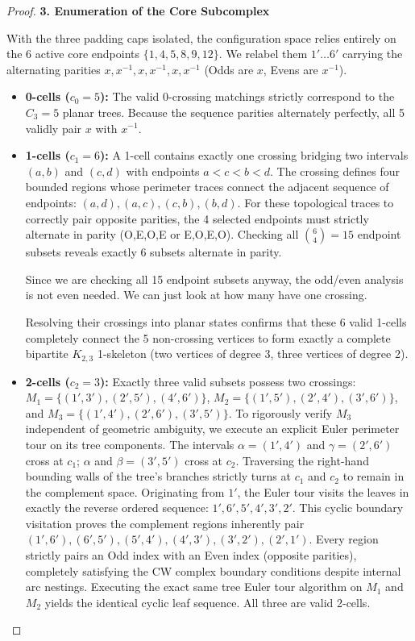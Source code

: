 \documentclass[12pt]{article}
\newcommand{\review}[1]{\begin{reviewbox}#1\end{reviewbox}}
\begin{document}
\begin{proof}
\vspace{1em}
\noindent\textbf{3. Enumeration of the Core Subcomplex}

With the three padding caps isolated, the configuration space relies entirely on the 6 active core endpoints $\{1, 4, 5, 8, 9, 12\}$. We relabel them $1' \dots 6'$ carrying the alternating parities $x, x^{-1}, x, x^{-1}, x, x^{-1}$ (Odds are $x$, Evens are $x^{-1}$).
\begin{itemize}
    \item \textbf{0-cells ($c_0=5$):} The valid 0-crossing matchings strictly correspond to the $C_3 = 5$ planar trees. Because the sequence parities alternately perfectly, all 5 validly pair $x$ with $x^{-1}$.
    \item \textbf{1-cells ($c_1=6$):} A 1-cell contains exactly one crossing bridging two intervals $(a,b)$ and $(c,d)$ with endpoints $a < c < b < d$. The crossing defines four bounded regions whose perimeter traces connect the adjacent sequence of endpoints: $(a,d), (a,c), (c,b), (b,d)$. For these topological traces to correctly pair opposite parities, the 4 selected endpoints must strictly alternate in parity (O,E,O,E or E,O,E,O). Checking all $\binom{6}{4}=15$ endpoint subsets reveals exactly 6 subsets alternate in parity. 
    \review{Since we are checking all 15 endpoint subsets anyway, the odd/even analysis is not even needed. We can just look at how many have one crossing.}
    Resolving their crossings into planar states confirms that these 6 valid 1-cells completely connect the 5 non-crossing vertices to form exactly a complete bipartite $K_{2,3}$ 1-skeleton (two vertices of degree 3, three vertices of degree 2).
    \item \textbf{2-cells ($c_2=3$):} Exactly three valid subsets possess two crossings: $M_1 = \{(1',3'), (2',5'), (4',6')\}$, $M_2 = \{(1',5'), (2',4'), (3',6')\}$, and $M_3 = \{(1',4'), (2',6'), (3',5')\}$. 
    To rigorously verify $M_3$ independent of geometric ambiguity, we execute an explicit Euler perimeter tour on its tree components. The intervals $\alpha=(1',4')$ and $\gamma=(2',6')$ cross at $c_1$; $\alpha$ and $\beta=(3',5')$ cross at $c_2$. Traversing the right-hand bounding walls of the tree's branches strictly turns at $c_1$ and $c_2$ to remain in the complement space. Originating from $1'$, the Euler tour visits the leaves in exactly the reverse ordered sequence: $1', 6', 5', 4', 3', 2'$. This cyclic boundary visitation proves the complement regions inherently pair $(1',6'), (6',5'), (5',4'), (4',3'), (3',2'), (2',1')$. Every region strictly pairs an Odd index with an Even index (opposite parities), completely satisfying the CW complex boundary conditions despite internal arc nestings. Executing the exact same tree Euler tour algorithm on $M_1$ and $M_2$ yields the identical cyclic leaf sequence. All three are valid 2-cells.

\end{itemize}
\end{proof}
\end{document}
